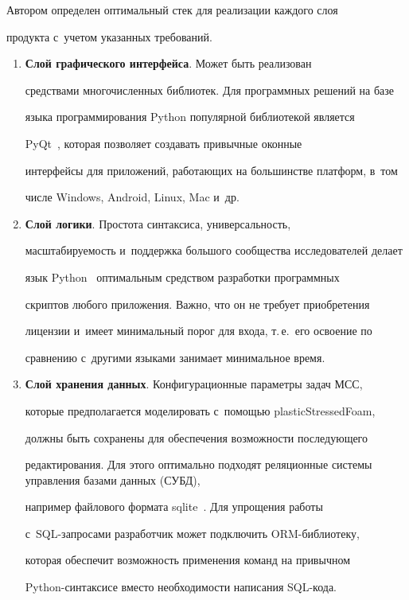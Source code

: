    


   Автором определен оптимальный стек для реализации каждого слоя 


продукта с~учетом указанных требований.


   \begin{enumerate}[1.]


\item \textbf{Слой графического интерфейса}. Может быть реализован 


средствами многочисленных биб\-лио\-тек. Для программных решений на базе 


языка программирования Python популярной биб\-лио\-те\-кой является 


PyQt~\cite{12-chi}, которая позволяет создавать привычные оконные 


интерфейсы для приложений, работающих на большинстве плат\-форм, в~том 


чис\-ле Windows, Android, Linux, Mac и~др. 


\item \textbf{Слой логики}. Простота синтаксиса, универсальность, 


масштабируемость и~поддержка большого сообщества исследователей делает 


язык Python~\cite{13-chi} оптимальным средством разработки программных 


скриптов любого приложения. Важ\-но, что он не требует приобретения 


лицензии и~имеет минимальный порог для входа, т.\,е.\ его освоение по 


сравнению с~другими языками занимает минимальное время.


\item \textbf{Слой хранения данных}. Конфигурационные параметры задач МСС, 


которые предполагается моделировать с~по\-мощью \mbox{plasticStressedFoam}, 


долж\-ны быть сохранены для обеспечения воз\-мож\-ности по\-сле\-ду\-юще\-го 


редактирования. Для этого оптимально подходят реляционные сис\-те\-мы управ\-ле\-ния базами данных (СУБД), 


например файлового формата sqlite~\cite{14-chi}. Для упрощения работы 


с~SQL-за\-про\-са\-ми разработчик может подключить ORM-биб\-лио\-те\-ку, 


которая обеспечит воз\-мож\-ность применения команд на привычном  


Python-син\-так\-си\-се вместо необходимости написания SQL-кода.


\end{enumerate}


